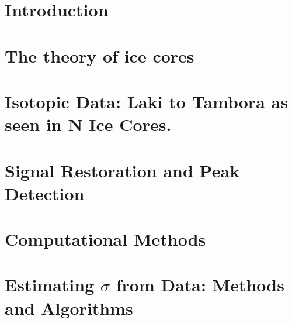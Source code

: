 \documentclass[11pt]{memoir}
\begin{document}
\newpage
 
\listoftodos

\tableofcontents*{}


\newpage
\listoffigures

\listoftables

\lstlistoflistings


\mainmatter

\chapter[Introduction][Introduction]{Introduction}




\chapter[Ice Theory][Ice Theory]{The theory of ice cores}




\chapter[Data][Data]{Isotopic Data: Laki to Tambora as seen in N Ice Cores.}





\chapter[Signal Analysis][Signal Analysis]{Signal Restoration and Peak Detection}




\chapter[Computational Methods]{Computational Methods}




\chapter[Method][Method]{Estimating $\sigma$ from Data: Methods and Algorithms}


\end{document}

